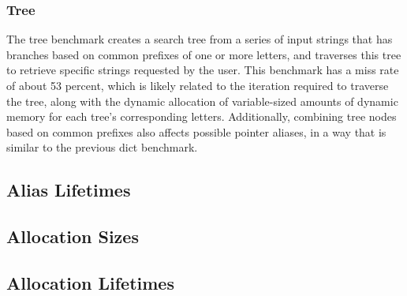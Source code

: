 \subsubsection{Tree}
The tree benchmark creates a search tree from a series of input strings that has branches based on common prefixes of one or more letters, and traverses this tree to retrieve specific strings requested by the user. This benchmark has a miss rate of about 53 percent, which is likely related to the iteration required to traverse the tree, along with the dynamic allocation of variable-sized amounts of dynamic memory for each tree's corresponding letters. Additionally, combining tree nodes based on common prefixes also affects possible pointer aliases, in a way that is similar to the previous dict benchmark.

\subsection{Alias Lifetimes}

\subsection{Allocation Sizes}

\subsection{Allocation Lifetimes}
